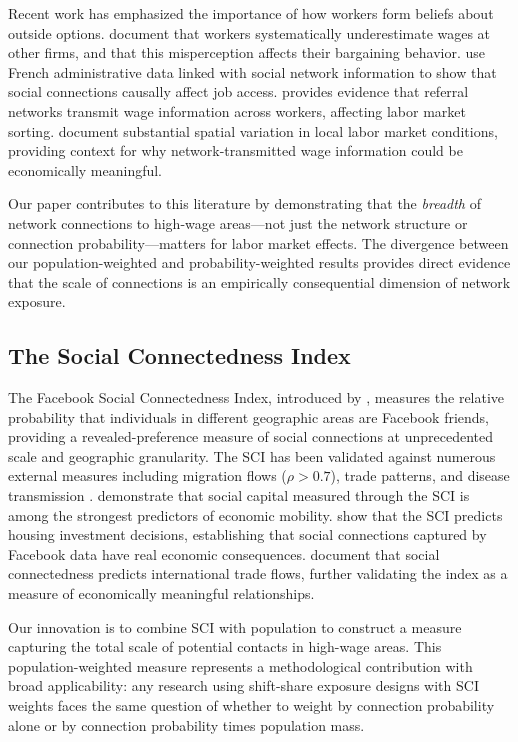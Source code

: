 \documentclass[12pt]{article}
\begin{document}
Recent work has emphasized the importance of how workers form beliefs about outside options. \citet{jager2024worker} document that workers systematically underestimate wages at other firms, and that this misperception affects their bargaining behavior. \citet{kramarz2023} use French administrative data linked with social network information to show that social connections causally affect job access. \citet{schmutte2015} provides evidence that referral networks transmit wage information across workers, affecting labor market sorting. \citet{klinemoretti2014} document substantial spatial variation in local labor market conditions, providing context for why network-transmitted wage information could be economically meaningful.

Our paper contributes to this literature by demonstrating that the \textit{breadth} of network connections to high-wage areas---not just the network structure or connection probability---matters for labor market effects. The divergence between our population-weighted and probability-weighted results provides direct evidence that the scale of connections is an empirically consequential dimension of network exposure.

\subsection{The Social Connectedness Index}

The Facebook Social Connectedness Index, introduced by \citet{bailey2018social}, measures the relative probability that individuals in different geographic areas are Facebook friends, providing a revealed-preference measure of social connections at unprecedented scale and geographic granularity. The SCI has been validated against numerous external measures including migration flows ($\rho > 0.7$), trade patterns, and disease transmission \citep{bailey2020social}. \citet{chetty2022social} demonstrate that social capital measured through the SCI is among the strongest predictors of economic mobility. \citet{bailey2018house} show that the SCI predicts housing investment decisions, establishing that social connections captured by Facebook data have real economic consequences. \citet{bailey2022social} document that social connectedness predicts international trade flows, further validating the index as a measure of economically meaningful relationships.

Our innovation is to combine SCI with population to construct a measure capturing the total scale of potential contacts in high-wage areas. This population-weighted measure represents a methodological contribution with broad applicability: any research using shift-share exposure designs with SCI weights faces the same question of whether to weight by connection probability alone or by connection probability times population mass.
\end{document}
